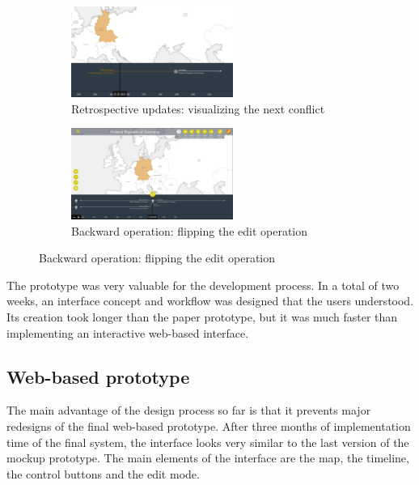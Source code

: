 \begin{figure}[ht]
\centering
\begin{subfigure}[b]{.5\textwidth}
  \centering
  \includegraphics[width=200px]{graphics/development/user_interface_design_process/retrospective_update.png}
  \caption{Retrospective updates: visualizing the next conflict}
  \label{sfig:retrospective_update}
\end{subfigure}%
\begin{subfigure}[b]{.5\textwidth}
  \centering
  \includegraphics[width=200px]{graphics/development/user_interface_design_process/backward_change.png}
  \caption{Backward operation: flipping the edit operation}
  \label{sfig:backward_change}
\end{subfigure}
\label{fig:backward_change}
\end{figure}

The prototype was very valuable for the development process. In a total of two weeks, an interface concept and workflow was designed that the users understood. Its creation took longer than the paper prototype, but it was much faster than implementing an interactive web-based interface.



\subsection{Web-based prototype} %
\label{sub:web_based_prototype}

The main advantage of the design process so far is that it prevents major redesigns of the final web-based prototype. After three months of implementation time of the final system, the interface looks very similar to the last version of the mockup prototype. The main elements of the interface are the map, the timeline, the control buttons and the edit mode.

